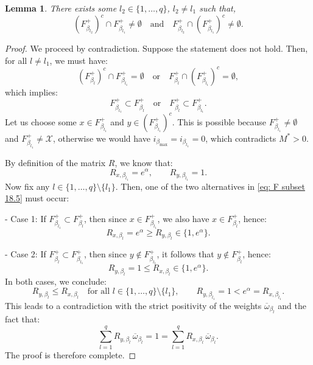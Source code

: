 \documentclass[a4paper, 11pt]{article}
\newtheorem{lem}{Lemma}
\theoremstyle{definition}
\newcommand{\cX}{{\mathcal{X}}}
\begin{document}
{\begin{lem}\label{lem : for subcase 4 finite cond on F}
	There exists some $l_2 \in \{1,\dots,q\}$, $l_2\neq l_1$ such that,
	\begin{equation*} 
		\left( F^{+}_{\beta_{l_2}}\right)^c \cap  F^+_{\beta_{l_1}}  \neq \emptyset \quad \text{and} \quad 	F^+_{\beta_{l_2}} \cap \left( F^{+}_{\beta_{l_1}}\right)^c \neq \emptyset.
	\end{equation*}
\end{lem}
\begin{proof}
We proceed by contradiction. Suppose the statement does not hold. Then, for all $l \neq l_1$, we must have:
\begin{equation*} 
    \left( F^{+}_{\beta_l} \right)^c \cap F^+_{\beta_{l_1}} = \emptyset 
    \quad \text{or} \quad 
    F^+_{\beta_l} \cap \left( F^+_{\beta_{l_1}} \right)^c = \emptyset,
\end{equation*}
which implies:
\begin{equation} \label{eq: F subset 18.5}
    F^+_{\beta_{l_1}} \subset F^+_{\beta_l}
    \quad \text{or} \quad
    F^+_{\beta_l} \subset F^+_{\beta_{l_1}}.
\end{equation}
Let us choose some $x \in F^+_{\beta_{l_1}}$ and $y \in \left( F^+_{\beta_{l_1}} \right)^c$.  
This is possible because $F^+_{\beta_{l_1}} \neq \emptyset$ and $F^+_{\beta_{l_1}} \neq \cX$,  
otherwise we would have $i_{\beta_{\max}} = i_{\beta_{l_1}} = 0$, which contradicts $M^* > 0$.

By definition of the matrix $R$, we know that:
\[
R_{x,\beta_{l_1}} = e^\alpha, \qquad R_{y,\beta_{l_1}} = 1.
\]
Now fix any $l \in \{1, \dots, q\} \setminus \{l_1\}$. Then, one of the two alternatives in \eqref{eq: F subset 18.5} must occur:

- Case 1: If $F^+_{\beta_{l_1}} \subset F^+_{\beta_l}$, then since $x \in F^+_{\beta_{l_1}}$, we also have $x \in F^+_{\beta_l}$, hence:
\[
R_{x,\beta_l} = e^\alpha \ge R_{y,\beta_l} \in \{1, e^\alpha\}.
\]

- Case 2: If $F^+_{\beta_l} \subset F^+_{\beta_{l_1}}$, then since $y \notin F^+_{\beta_{l_1}}$, it follows that $y \notin F^+_{\beta_l}$, hence:
\[
R_{y,\beta_l} = 1 \le R_{x,\beta_l} \in \{1, e^\alpha\}.
\]
In both cases, we conclude:
\[
R_{y,\beta_l} \le R_{x,\beta_l} \quad \text{for all } l \in \{1, \dots, q\} \setminus \{l_1\}, \qquad
R_{y,\beta_{l_1}} = 1 < e^\alpha = R_{x,\beta_{l_1}}.
\]
This leads to a contradiction with the strict positivity of the weights $\overline{\omega}_{\beta_l}$ and the fact that:
\begin{equation*}
    \sum_{l=1}^q R_{y,\beta_l} \, \overline{\omega}_{\beta_l} = 1 = 
    \sum_{l=1}^q R_{x,\beta_l} \, \overline{\omega}_{\beta_l}.
\end{equation*}
The proof is therefore complete.


\end{proof}}
\end{document}
